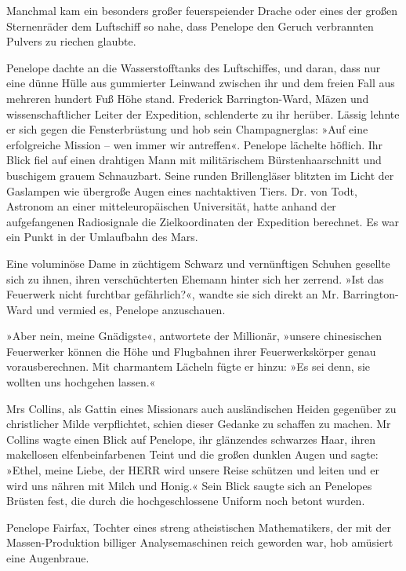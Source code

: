 \bigpar

Manchmal kam ein besonders großer feuerspeiender Drache oder eines
der großen Sternenräder dem Luftschiff so nahe, dass Penelope den
Geruch verbrannten Pulvers zu riechen glaubte.

Penelope dachte an die Wasserstofftanks des Luftschiffes, und
daran, dass nur eine dünne Hülle aus gummierter Leinwand zwischen
ihr und dem freien Fall aus mehreren hundert Fuß Höhe stand.
Frederick Barrington-Ward, Mäzen und wissenschaftlicher Leiter der
Expedition, schlenderte zu ihr herüber. Lässig lehnte er sich gegen
die Fensterbrüstung und hob sein Champagnerglas: »Auf eine
erfolgreiche Mission -- wen immer wir antreffen«. Penelope lächelte
höflich. Ihr Blick fiel auf einen drahtigen Mann mit militärischem
Bürstenhaarschnitt und buschigem grauem Schnauzbart. Seine runden
Brillengläser blitzten im Licht der Gaslampen wie übergroße Augen
eines nachtaktiven Tiers. Dr. von Todt, Astronom an einer
mitteleuropäischen Universität, hatte anhand der aufgefangenen
Radiosignale die Zielkoordinaten der Expedition berechnet. Es war
ein Punkt in der Umlaufbahn des Mars.

Eine voluminöse Dame in züchtigem Schwarz und vernünftigen Schuhen
gesellte sich zu ihnen, ihren verschüchterten Ehemann hinter sich
her zerrend. »Ist das Feuerwerk nicht furchtbar gefährlich?«,
wandte sie sich direkt an Mr. Barrington-Ward und vermied es,
Penelope anzuschauen.

»Aber nein, meine Gnädigste«, antwortete der Millionär, »unsere
chinesischen Feuerwerker können die Höhe und Flugbahnen ihrer
Feuerwerkskörper genau vorausberechnen. Mit charmantem Lächeln
fügte er hinzu: »Es sei denn, sie wollten uns hochgehen lassen.«

Mrs Collins, als Gattin eines Missionars auch ausländischen Heiden
gegenüber zu christlicher Milde verpflichtet, schien dieser Gedanke
zu schaffen zu machen. Mr Collins wagte einen Blick auf Penelope,
ihr glänzendes schwarzes Haar, ihren makellosen elfenbeinfarbenen
Teint und die großen dunklen Augen und sagte: »Ethel, meine Liebe,
der HERR wird unsere Reise schützen und leiten und er wird uns
nähren mit Milch und Honig.« Sein Blick saugte sich an Penelopes
Brüsten fest, die durch die hochgeschlossene Uniform noch betont
wurden.

Penelope Fairfax, Tochter eines streng atheistischen Mathematikers,
der mit der Massen-Produktion billiger Analysemaschinen reich
geworden war, hob amüsiert eine Augenbraue.

\bigpar

